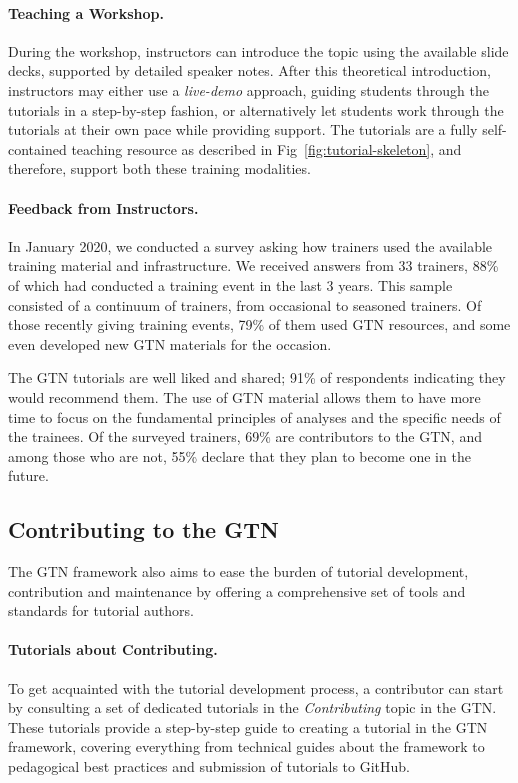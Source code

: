 \paragraph{Teaching a Workshop.} During the workshop, instructors can introduce the topic using the available slide decks, supported by detailed speaker notes. After this theoretical introduction, instructors may either use a \emph{live-demo} approach, guiding students through the tutorials in a step-by-step fashion, or alternatively let students work through the tutorials at their own pace while providing support. The tutorials are a fully self-contained teaching resource as described in Fig~\ref{fig:tutorial-skeleton}, and therefore, support both these training modalities. 

\paragraph{Feedback from Instructors.}
In January 2020, we conducted a survey asking how trainers used the available training material and infrastructure. We received answers from 33 trainers, 88\% of which had conducted a training event in the last 3 years.
This sample consisted of a continuum of trainers, from occasional to seasoned trainers. Of those recently giving training events, 79\% of them used GTN resources, and some even developed new GTN materials for the occasion. 

The GTN tutorials are well liked and shared; 91\% of respondents indicating they would recommend them. The use of GTN material allows them to have more time to focus on the fundamental principles of analyses and the specific needs of the trainees. Of the surveyed trainers, 69\% are contributors to the GTN, and among those who are not, 55\% declare that they plan to become one in the future.

\subsection*{Contributing to the GTN}

The GTN framework also aims to ease the burden of tutorial development, contribution and maintenance by offering a comprehensive set of tools and standards for tutorial authors. 

\paragraph*{Tutorials about Contributing.} 
To get acquainted with the tutorial development process, a contributor can start by consulting a set of dedicated tutorials in the \emph{Contributing} topic in the GTN. These tutorials provide a step-by-step guide to creating a tutorial in the GTN framework, covering everything from technical guides about the framework to pedagogical best practices and submission of tutorials to GitHub.

